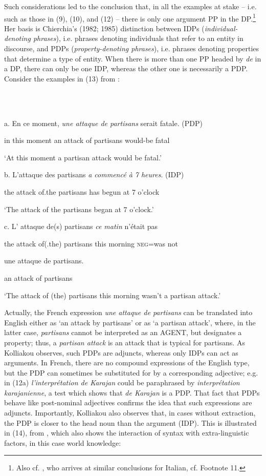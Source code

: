 \documentclass[output=paper]{langsci/langscibook}
\begin{document}
Such considerations led \citet{Kolliakou1999} to the conclusion that, in all the examples at stake – i.e. such as those in (9), (10), and (12) – there is only one argument PP in the DP.\footnote{Also cf. \citet[93]{Cinque2014}, who arrives at similar conclusions for Italian, cf. Footnote 11.} Her basis is Chierchia’s (1982; 1985) distinction between IDPs (\textit{individual-denoting phrases}), i.e. phrases denoting individuals that refer to an entity in discourse, and PDPs (\textit{property-denoting phrases}), i.e. phrases denoting properties that determine a type of entity. When there is more than one PP headed by \textit{de} in a DP, there can only be one IDP, whereas the other one is necessarily a PDP. Consider the examples in (13) from \citet[736]{Kolliakou1999}:

\ea%
    \label{ex:key:13}
    \gll\\
        \\
    \glt
    \z

            a.   En ce moment,  \textit{une  attaque  de  partisans}  serait  fatale. (PDP)

    in this  moment  an  attack  of  partisans  would-be  fatal

     ‘At this moment a partisan attack would be fatal.’

    b.   L’attaque  des  partisans  \textit{a  commencé  à 7 heures}. (IDP)

    the attack  of.the  partisans  has  begun    at 7 o’clock

    ‘The attack of the partisans began at 7 o’clock.’

    c.   L’  attaque  de(s)   partisans  \textit{ce  matin}    n’était    pas

    the  attack    of(.the) partisans  this  morning  \textsc{neg}=was  not  

   une  attaque  de  partisans.

    an  attack    of  partisans 

    ‘The attack of (the) partisans this morning wasn’t a partisan attack.’

Actually, the French expression \textit{une attaque de partisans} can be translated into English either as ‘an attack by partisans’ or as ‘a partisan attack’, where, in the latter case, \textit{partisans} cannot be interpreted as an AGENT, but designates a property; thus, a \textit{partisan attack} is an attack that is typical for partisans. As Kolliakou observes, such PDPs are adjuncts, whereas only IDPs can act as arguments. In French, there are no compound expressions of the English type, but the PDP can sometimes be substituted for by a corresponding adjective; e.g. in (12a) \textit{l’interprétation de Karajan} could be paraphrased by \textit{interprétation} \textit{karajanienne}, a test which shows that \textit{de Karajan} is a PDP. That fact that PDPs behave like post-nominal adjectives confirms the idea that such expressions are adjuncts. Importantly, Kolliakou also observes that, in cases without extraction, the PDP is closer to the head noun than the argument (IDP). This is illustrated in (14), from \citet[714]{Kolliakou1999}, which also shows the interaction of syntax with extra-linguistic factors, in this case world knowledge:
\end{document}
